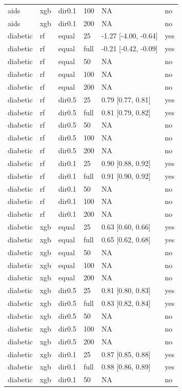 \begin{tabular}{llllll}
aids & xgb & dir0.1 & 100 & NA & no \\
aids & xgb & dir0.1 & 200 & NA & no \\
\addlinespace
diabetic & rf & equal & 25 & -1.27 [-4.00, -0.64] & yes \\
diabetic & rf & equal & full & -0.21 [-0.42, -0.09] & yes \\
diabetic & rf & equal & 50 & NA & no \\
diabetic & rf & equal & 100 & NA & no \\
diabetic & rf & equal & 200 & NA & no \\
diabetic & rf & dir0.5 & 25 & 0.79 [0.77, 0.81] & yes \\
diabetic & rf & dir0.5 & full & 0.81 [0.79, 0.82] & yes \\
diabetic & rf & dir0.5 & 50 & NA & no \\
diabetic & rf & dir0.5 & 100 & NA & no \\
diabetic & rf & dir0.5 & 200 & NA & no \\
diabetic & rf & dir0.1 & 25 & 0.90 [0.88, 0.92] & yes \\
diabetic & rf & dir0.1 & full & 0.91 [0.90, 0.92] & yes \\
diabetic & rf & dir0.1 & 50 & NA & no \\
diabetic & rf & dir0.1 & 100 & NA & no \\
diabetic & rf & dir0.1 & 200 & NA & no \\
diabetic & xgb & equal & 25 & 0.63 [0.60, 0.66] & yes \\
diabetic & xgb & equal & full & 0.65 [0.62, 0.68] & yes \\
diabetic & xgb & equal & 50 & NA & no \\
diabetic & xgb & equal & 100 & NA & no \\
diabetic & xgb & equal & 200 & NA & no \\
diabetic & xgb & dir0.5 & 25 & 0.81 [0.80, 0.83] & yes \\
diabetic & xgb & dir0.5 & full & 0.83 [0.82, 0.84] & yes \\
diabetic & xgb & dir0.5 & 50 & NA & no \\
diabetic & xgb & dir0.5 & 100 & NA & no \\
diabetic & xgb & dir0.5 & 200 & NA & no \\
diabetic & xgb & dir0.1 & 25 & 0.87 [0.85, 0.88] & yes \\
diabetic & xgb & dir0.1 & full & 0.88 [0.86, 0.89] & yes \\
diabetic & xgb & dir0.1 & 50 & NA & no \\

\end{tabular}
